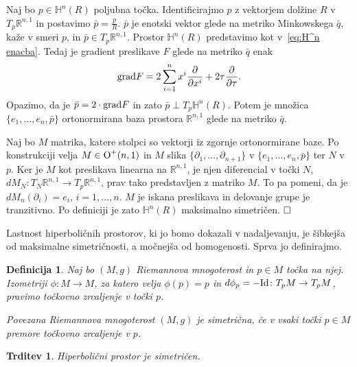 \documentclass[a4paper]{article}
\newtheorem{definicija}{Definicija}
\newtheorem{trditev}{Trditev}
\def\qed{$\hfill\Box$}   %
\begin{document}
Naj bo $p \in \mathbb{H}^{n}(R)$ poljubna točka. Identificirajmo $p$ z vektorjem dolžine $R$ v $T_{p}\mathbb{R}^{n,1}$  in postavimo $\bar{p} = \frac{p}{R}$. $\bar{p}$ je enotski vektor glede na metriko Minkowskega $\bar{q}$, kaže v smeri $p$, in $\bar{p} \in T_{p}\mathbb{R}^{n,1}$.
Prostor $\mathbb{H}^{n}(R)$ predstavimo kot v~\ref{eq:H^n enacba}.
Tedaj je gradient preslikave $F$ glede na metriko $\bar{q}$ enak
\begin{equation}
\textup{grad} F = 2 \sum_{i=1}^{n} x^{i} \frac{\partial}{\partial x^{i}} + 2\tau \frac{\partial}{\partial \tau}. \nonumber
\end{equation} 
Opazimo, da je $\bar{p} = 2 \cdot \textup{grad} F$ in zato $\bar{p} \perp T_{p}\mathbb{H}^{n}(R)$.
Potem je množica $\{ e_{1}, \dots , e_{n}, \bar{p} \}$ ortonormirana baza prostora $\mathbb{R}^{n,1}$ glede na metriko $\bar{q}$.

Naj bo $M$ matrika, katere stolpci so vektorji iz zgornje ortonormirane baze. Po konstrukciji velja $M \in \textup{O}^{+}(n,1)$ in $M$ slika $\{\partial_{1}, \dots , \partial_{n+1} \}$ v $\{e_{1}, \dots , e_{n}, \bar{p} \}$ ter $N$ v $p$.
Ker je $M$ kot preslikava linearna na $\mathbb{R}^{n,1}$, je njen diferencial v točki $N$, $dM_{N} \colon T_{N}\mathbb{R}^{n,1} \to T_{p}\mathbb{R}^{n,1}$, prav tako predstavljen z matriko $M$. To pa pomeni, da je $dM_{n}(\partial_{i}) = e_{i}$, $i = 1, \dots , n$.
$M$ je iskana preslikava in delovanje grupe je tranzitivno. Po definiciji je zato $\mathbb{H}^{n}(R)$ maksimalno simetričen.
\qed
\newline

Lastnost hiperboličnih prostorov, ki jo bomo dokazali v nadaljevanju, je šibkejša od maksimalne simetričnosti, a močnejša od homogenosti. Sprva jo definirajmo.

\begin{definicija}
Naj bo $(M,g)$ Riemannova mnogoterost in $p\in M$ točka na njej. Izometriji $\phi \colon M \to M$, za katero velja $\phi(p) = p$ in $d\phi_{p} = -\textup{Id} \colon T_{p}M \to T_{p}M$, pravimo \emph{točkovno zrcaljenje} v točki $p$.

Povezana Riemannova mnogoterost $(M,g)$ je \emph{simetrična}, če v vsaki točki $p \in M$ premore točkovno zrcaljenje v $p$.
\end{definicija}

\begin{trditev}
Hiperbolični prostor je simetričen.
\end{trditev}
\end{document}

